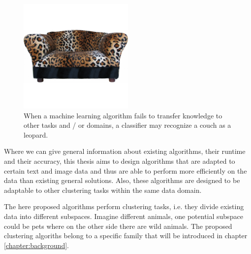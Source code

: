 \begin{figure}[h]
    \centering
    \includegraphics[width=0.5\textwidth]{images/sofa}
    \caption{When a machine learning algorithm fails to transfer knowledge to other tasks and / or domains, a classifier may recognize a couch as a leopard.}
    \label{fig:couch}
\end{figure}

Where we can give general information about existing algorithms, their runtime and their accuracy, this thesis aims to design algorithms that are adapted to certain text and image data and thus are able to perform more efficiently on the data than existing general solutions. Also, these algorithms are designed to be adaptable to other clustering tasks within the same data domain.

The here proposed algorithms perform clustering tasks, i.e. they divide existing data into different subspaces. Imagine different animals, one potential subspace could be pets where on the other side there are wild animals. The proposed clustering algoriths belong to a specific family that will be introduced in chapter \ref{chapter:background}.